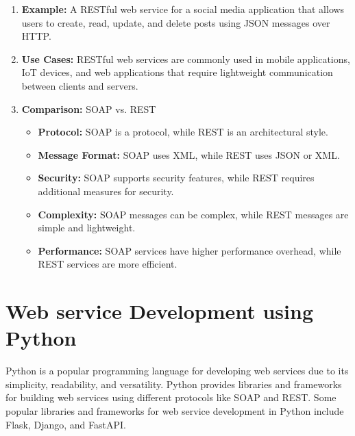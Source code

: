\documentclass[11pt]{article}
\begin{document}
\begin{enumerate}
\begin{itemize}
          \end{itemize}
    \item \textbf{Example:} A RESTful web service for a social media application that allows users to create, read, update, and delete posts using JSON messages over HTTP.
    \item \textbf{Use Cases:} RESTful web services are commonly used in mobile applications, IoT devices, and web applications that require lightweight communication between clients and servers.
    \item \textbf{Comparison:} SOAP vs. REST
          \begin{itemize}
              \item \textbf{Protocol:} SOAP is a protocol, while REST is an architectural style.
              \item \textbf{Message Format:} SOAP uses XML, while REST uses JSON or XML.
              \item \textbf{Security:} SOAP supports security features, while REST requires additional measures for security.
              \item \textbf{Complexity:} SOAP messages can be complex, while REST messages are simple and lightweight.
              \item \textbf{Performance:} SOAP services have higher performance overhead, while REST services are more efficient.
          \end{itemize}
\end{enumerate}


\section{Web service Development using Python}

Python is a popular programming language for developing web services due to its simplicity, readability, and versatility. Python provides libraries and frameworks for building web services using different protocols like SOAP and REST. Some popular libraries and frameworks for web service development in Python include Flask, Django, and FastAPI.
\end{document}
